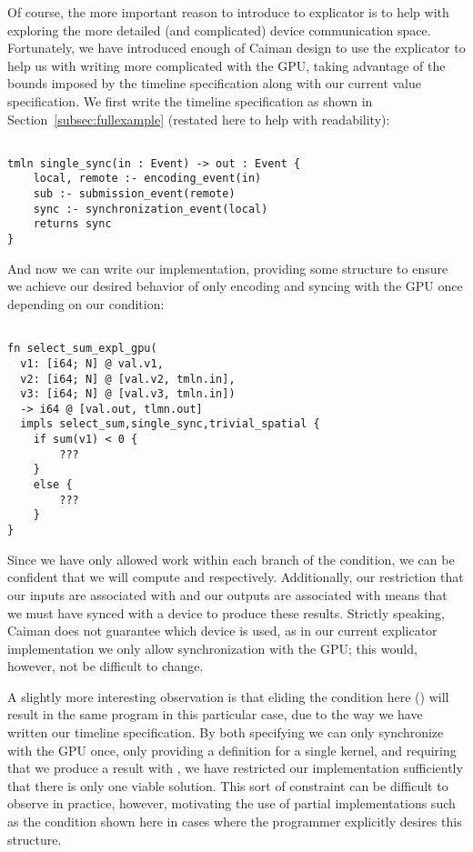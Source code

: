 Of course, the more important reason to introduce to explicator is to help with exploring the more detailed (and complicated) device communication space.  Fortunately, we have introduced enough of Caiman design to use the explicator to help us with writing more complicated with the GPU, taking advantage of the bounds imposed by the timeline specification along with our current value specification.  We first write the timeline specification as shown in Section~\ref{subsec:fullexample} (restated here to help with readability):
%
\begin{lstlisting}

tmln single_sync(in : Event) -> out : Event {
    local, remote :- encoding_event(in)
    sub :- submission_event(remote)
    sync :- synchronization_event(local)
    returns sync
}
\end{lstlisting}
%
And now we can write our implementation, providing some structure to ensure we achieve our desired behavior of only encoding and syncing with the GPU once depending on our condition:
%
\begin{lstlisting}

fn select_sum_expl_gpu(
  v1: [i64; N] @ val.v1, 
  v2: [i64; N] @ [val.v2, tmln.in], 
  v3: [i64; N] @ [val.v3, tmln.in]) 
  -> i64 @ [val.out, tlmn.out] 
  impls select_sum,single_sync,trivial_spatial {
    if sum(v1) < 0 {
        ???
    }
    else {
        ???
    } 
}
\end{lstlisting}
%
Since we have only allowed work within each branch of the condition, we can be confident that we will compute  and  respectively.  Additionally, our restriction that our inputs are associated with  and our outputs are associated with  means that we must have synced with a device to produce these results.  Strictly speaking, Caiman does not guarantee which device is used, as in our current explicator implementation we only allow synchronization with the GPU; this would, however, not be difficult to change.

A slightly more interesting observation is that eliding the condition here () will result in the same program in this particular case, due to the way we have written our timeline specification.  By both specifying we can only synchronize with the GPU once, only providing a definition for a single  kernel, and requiring that we produce a result with , we have restricted our implementation sufficiently that there is only one viable solution.  This sort of constraint can be difficult to observe in practice, however, motivating the use of partial implementations such as the condition shown here in cases where the programmer explicitly desires this structure.

